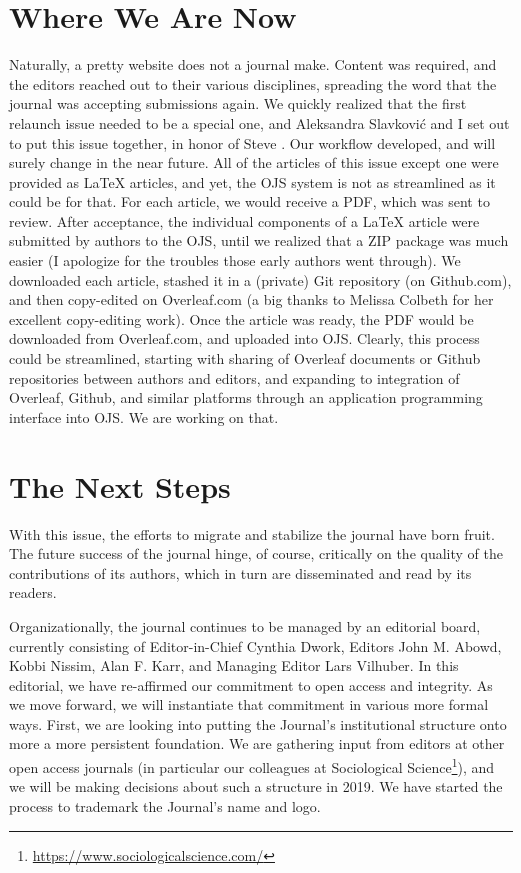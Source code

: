 \documentclass[final]{jpcfinal} %
\newcommand{\urlcite}[2]{#2\footnote{\url{#1}}}
\begin{document}
\section{Where We Are Now}
Naturally, a pretty website does not a journal make. Content was required, and the editors reached out to their various disciplines, spreading the word that the journal was accepting submissions again. We quickly realized that the first relaunch issue needed to be a special one, and Aleksandra Slavkovi\'c and I set out to put this issue together, in honor of Steve \citep{SesaLarsEditorial}. Our workflow developed, and will surely change in the near future. All of the articles of this issue except one were provided as \LaTeX{} articles, and yet, the OJS system is not as streamlined as it could be for that. For each article, we would receive a PDF, which was sent to review. After acceptance, the individual components of a \LaTeX{} article were submitted by authors to the OJS, until we realized that a ZIP package was much easier (I apologize for the troubles those early authors went through). We downloaded each article, stashed it in a (private) Git repository (on Github.com), and then copy-edited on Overleaf.com (a big thanks to Melissa Colbeth for her excellent copy-editing work). Once the article was ready, the PDF would be downloaded from Overleaf.com, and uploaded into OJS. Clearly, this process could be streamlined, starting with sharing of Overleaf documents or Github repositories between authors and editors, and expanding to  integration of Overleaf, Github, and similar platforms through an application programming interface into OJS. We are working on that. 

\section{The Next Steps}

With this issue, the efforts to migrate and stabilize the journal have born fruit. The future success of the journal hinge, of course, critically on the quality of the contributions of its authors, which in turn are disseminated and read by its readers.

Organizationally, the journal continues to be managed by an editorial board, currently consisting of Editor-in-Chief 
Cynthia Dwork, Editors 
John M. Abowd, 
Kobbi Nissim, 
Alan F. Karr, and 
Managing Editor
Lars Vilhuber. In this editorial, we have re-affirmed our commitment to open access and integrity. As we move forward, we will instantiate that commitment in various more formal ways. First, we are looking into putting the Journal's institutional structure onto more a more persistent foundation. We are gathering  input from editors at other open access journals (in particular our colleagues at \urlcite{https://www.sociologicalscience.com/}{Sociological Science}), and we will be making decisions about such a structure in 2019. We have started the process to trademark the Journal's name and logo.
\end{document}

